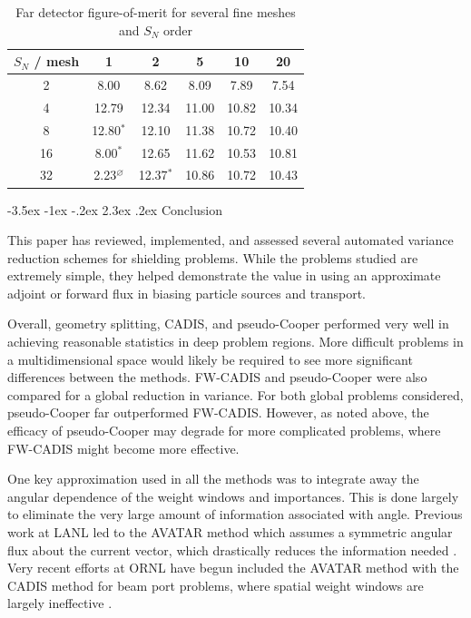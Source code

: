 \documentclass[letter,11pt]{article}
\makeatletter
\renewcommand\section{\@startsection{section}{1}{\z@}%
                                {-3.5ex \@plus -1ex \@minus -.2ex}%
                                {2.3ex \@plus.2ex}%
                                {\normalfont\large\bf}}
\makeatother
\begin{document}
\begin{table}[th]
 \caption{Far detector figure-of-merit for several fine meshes and $S_N$ order}
 \begin{center} 
 {\small
 \begin{tabular*}{0.70\textwidth}{@{\extracolsep{\fill}} cccccc } 
  \toprule 
   {\sc $S_N$ / mesh}  &  1  &  2  &  5  &  10  &  20  \\
  \midrule 
   2  & 8.00 & 8.62 & 8.09 & 7.89 & 7.54 \\
   4  & 12.79 & 12.34 & 11.00 & 10.82 & 10.34 \\
   8  & 12.80$^{*}$ & 12.10 & 11.38 & 10.72 & 10.40 \\
   16 & 8.00$^{*}$ & 12.65 & 11.62 & 10.53 & 10.81 \\ 
   32 & 2.23$^{\varnothing}$ & 12.37$^{*}$ & 10.86 & 10.72 & 10.43 \\
  \bottomrule 
 \end{tabular*} 
 }
 \end{center} 
 \label{tbl:snmeshstudy}  
\end{table}



\section{Conclusion}
\label{sec:conc}

This paper has reviewed, implemented, and assessed several automated variance reduction schemes for shielding problems.  While the problems studied are extremely simple, they helped demonstrate the value in using an approximate adjoint or forward flux in biasing particle sources and transport.  

Overall, geometry splitting, CADIS, and pseudo-Cooper performed very well in achieving reasonable statistics in deep problem regions.  More difficult problems in a multidimensional space would likely be required to see more significant differences between the methods.   FW-CADIS and pseudo-Cooper were also compared for a global reduction in variance.  For both global problems considered, pseudo-Cooper far outperformed FW-CADIS.   However, as noted above, the efficacy of pseudo-Cooper may degrade for more complicated problems, where FW-CADIS might become more effective.

One key approximation used in all the methods was to integrate away the angular dependence of the weight windows and importances.  This is done largely to eliminate the very large amount of information associated with angle.  Previous work at LANL led to the AVATAR method which assumes a symmetric angular flux about the current vector, which drastically reduces the information needed \cite{vanriper1997ava}.  Very recent efforts at ORNL have begun included the AVATAR method with the CADIS method for beam port problems, where spatial weight windows are largely ineffective \cite{peplow2010hmc}.  
\end{document}
